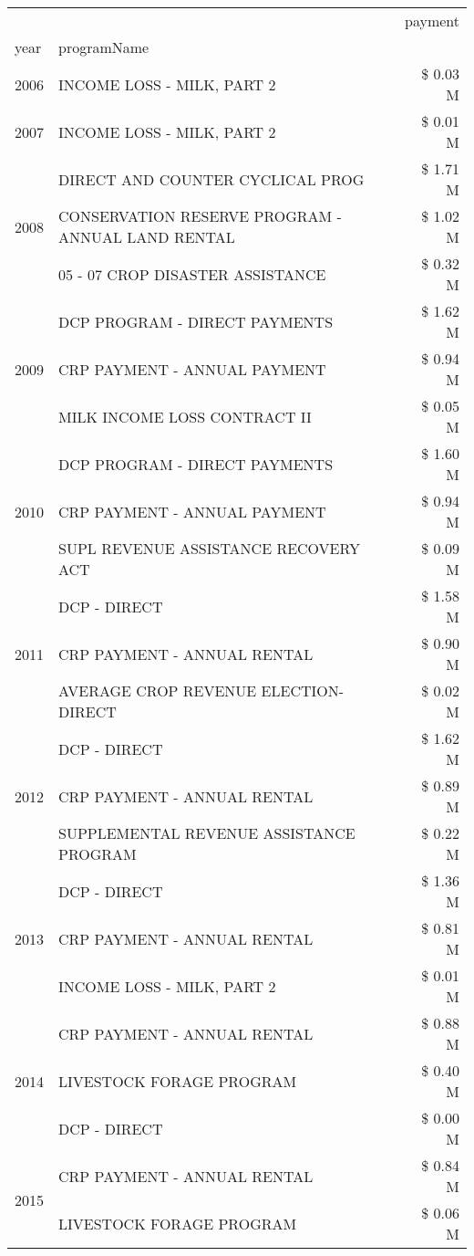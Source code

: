 \begin{tabular}{llr}
\toprule
 &  & payment \\
year & programName &  \\
\midrule
2006 & INCOME LOSS - MILK, PART 2 & \$ 0.03 M \\
\cline{1-3}
2007 & INCOME LOSS - MILK, PART 2 & \$ 0.01 M \\
\cline{1-3}
\multirow[t]{3}{*}{2008} & DIRECT AND COUNTER CYCLICAL PROG & \$ 1.71 M \\
 & CONSERVATION RESERVE PROGRAM - ANNUAL LAND RENTAL & \$ 1.02 M \\
 & 05 - 07 CROP DISASTER ASSISTANCE & \$ 0.32 M \\
\cline{1-3}
\multirow[t]{3}{*}{2009} & DCP PROGRAM - DIRECT PAYMENTS & \$ 1.62 M \\
 & CRP PAYMENT - ANNUAL PAYMENT & \$ 0.94 M \\
 & MILK INCOME LOSS CONTRACT II & \$ 0.05 M \\
\cline{1-3}
\multirow[t]{3}{*}{2010} & DCP PROGRAM - DIRECT PAYMENTS & \$ 1.60 M \\
 & CRP PAYMENT - ANNUAL PAYMENT & \$ 0.94 M \\
 & SUPL REVENUE ASSISTANCE RECOVERY ACT & \$ 0.09 M \\
\cline{1-3}
\multirow[t]{3}{*}{2011} & DCP - DIRECT & \$ 1.58 M \\
 & CRP PAYMENT - ANNUAL RENTAL & \$ 0.90 M \\
 & AVERAGE CROP REVENUE ELECTION-DIRECT & \$ 0.02 M \\
\cline{1-3}
\multirow[t]{3}{*}{2012} & DCP - DIRECT & \$ 1.62 M \\
 & CRP PAYMENT - ANNUAL RENTAL & \$ 0.89 M \\
 & SUPPLEMENTAL REVENUE ASSISTANCE PROGRAM & \$ 0.22 M \\
\cline{1-3}
\multirow[t]{3}{*}{2013} & DCP - DIRECT & \$ 1.36 M \\
 & CRP PAYMENT - ANNUAL RENTAL & \$ 0.81 M \\
 & INCOME LOSS - MILK, PART 2 & \$ 0.01 M \\
\cline{1-3}
\multirow[t]{3}{*}{2014} & CRP PAYMENT - ANNUAL RENTAL & \$ 0.88 M \\
 & LIVESTOCK FORAGE PROGRAM & \$ 0.40 M \\
 & DCP - DIRECT & \$ 0.00 M \\
\cline{1-3}
\multirow[t]{3}{*}{2015} & CRP PAYMENT - ANNUAL RENTAL & \$ 0.84 M \\
 & LIVESTOCK FORAGE PROGRAM & \$ 0.06 M \\

\end{tabular}
